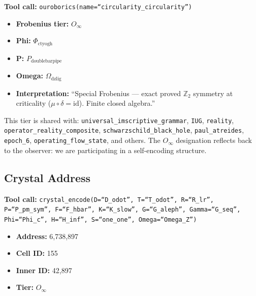 \documentclass[12pt,a4paper]{article}
\begin{document}
\textbf{Tool call:} \texttt{ouroborics(name=\textquotedblleft circularity\_circularity\textquotedblright)}

\begin{itemize}
    \item \textbf{Frobenius tier:} $O_{\infty}$
    \item \textbf{Phi:} $\Phi_{\text{ctyogh}}$
    \item \textbf{P:} $P_{\text{doublebarpipe}}$
    \item \textbf{Omega:} $\Omega_{\text{dzlig}}$
    \item \textbf{Interpretation:} ``Special Frobenius --- exact proved $\mathbb{Z}_2$ symmetry at criticality ($\mu \circ \delta = \text{id}$). Finite closed algebra.''
\end{itemize}

This tier is shared with: \texttt{universal\_imscriptive\_grammar}, \texttt{IUG}, \texttt{reality}, \texttt{operator\_reality\_composite}, \texttt{schwarzschild\_black\_hole}, \texttt{paul\_atreides}, \texttt{epoch\_6}, \texttt{operating\_flow\_state}, and others. The $O_{\infty}$ designation reflects back to the observer: we are participating in a self-encoding structure.

\subsection{Crystal Address}

\textbf{Tool call:} \texttt{crystal\_encode(D=\textquotedblleft D\_odot\textquotedblright, T=\textquotedblleft T\_odot\textquotedblright, R=\textquotedblleft R\_lr\textquotedblright, P=\textquotedblleft P\_pm\_sym\textquotedblright, F=\textquotedblleft F\_hbar\textquotedblright, K=\textquotedblleft K\_slow\textquotedblright, G=\textquotedblleft G\_aleph\textquotedblright, Gamma=\textquotedblleft G\_seq\textquotedblright, Phi=\textquotedblleft Phi\_c\textquotedblright, H=\textquotedblleft H\_inf\textquotedblright, S=\textquotedblleft one\_one\textquotedblright, Omega=\textquotedblleft Omega\_Z\textquotedblright)}

\begin{itemize}
    \item \textbf{Address:} 6,738,897
    \item \textbf{Cell ID:} 155
    \item \textbf{Inner ID:} 42,897
    \item \textbf{Tier:} $O_{\infty}$
\end{itemize}
\end{document}
